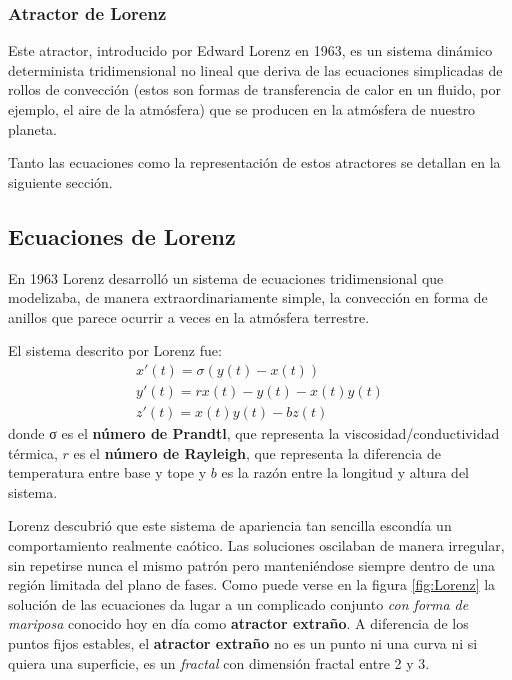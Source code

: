 %


\subsubsection{Atractor de Lorenz}
Este atractor, introducido por Edward Lorenz en 1963, es un sistema dinámico determinista tridimensional no lineal que deriva de las ecuaciones simplicadas de rollos de convección (estos son formas de transferencia de calor en un fluido, por ejemplo, el aire de la atmósfera) que se producen en la atmósfera de nuestro planeta.

Tanto las ecuaciones como la representación de estos atractores se detallan en la siguiente sección.

\subsection{Ecuaciones de Lorenz}
\begin{definition}
En 1963 Lorenz desarrolló un sistema de ecuaciones tridimensional que modelizaba, de manera extraordinariamente simple, la convección en forma de anillos que parece ocurrir a veces en la atmósfera terrestre.

El sistema descrito por Lorenz fue:
\[\begin{array}{l}
x'(t) = σ(y(t)-x(t)) \\
y'(t) = rx(t)-y(t)-x(t)y(t)\\
z'(t) = x(t)y(t)-bz(t)
\end{array}\]
donde σ es el \textbf{número de Prandtl}, que representa la viscosidad/conductividad térmica, $r$ es el \textbf{número de Rayleigh}, que representa la diferencia de temperatura entre base y tope y $b$ es la razón entre la longitud y altura del sistema.
\end{definition}

Lorenz descubrió que este sistema de apariencia tan sencilla escondía un comportamiento realmente caótico. Las soluciones oscilaban de manera irregular, sin repetirse nunca el mismo patrón pero manteniéndose siempre dentro de una región limitada del plano de fases. Como puede verse en la figura \ref{fig:Lorenz} la solución de las ecuaciones da lugar a un complicado conjunto \emph{con forma de mariposa} conocido hoy en día como \textbf{atractor extraño}. A diferencia de los puntos fijos estables, el \textbf{atractor extraño} no es un punto ni una curva ni si quiera una superficie, es un \emph{fractal} con dimensión fractal entre 2 y 3.

